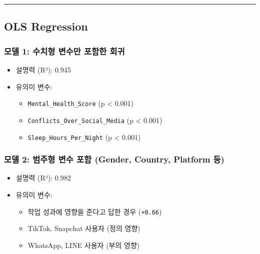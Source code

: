 \documentclass[11pt]{article}
\providecommand{\tightlist}{%
      \setlength{\itemsep}{0pt}\setlength{\parskip}{0pt}}
\begin{document}
    \begin{center}\rule{0.5\linewidth}{0.5pt}\end{center}

\subsection{OLS Regression}\label{ols-regression}

\subsubsection{모델 1: 수치형 변수만 포함한
회귀}\label{uxbaa8uxb378-1-uxc218uxce58uxd615-uxbcc0uxc218uxb9cc-uxd3ecuxd568uxd55c-uxd68cuxadc0}

\begin{itemize}
\tightlist
\item
  설명력 (R²): 0.945
\item
  유의미 변수:

  \begin{itemize}
  \tightlist
  \item
    \texttt{Mental\_Health\_Score} (p \textless{} 0.001)
  \item
    \texttt{Conflicts\_Over\_Social\_Media} (p \textless{} 0.001)
  \item
    \texttt{Sleep\_Hours\_Per\_Night} (p \textless{} 0.001)
  \end{itemize}
\end{itemize}

\subsubsection{모델 2: 범주형 변수 포함 (Gender, Country, Platform
등)}\label{uxbaa8uxb378-2-uxbc94uxc8fcuxd615-uxbcc0uxc218-uxd3ecuxd568-gender-country-platform-uxb4f1}

\begin{itemize}
\tightlist
\item
  설명력 (R²): 0.982
\item
  유의미 변수:

  \begin{itemize}
  \tightlist
  \item
    학업 성과에 영향을 준다고 답한 경우 (\texttt{+0.66})
  \item
    TikTok, Snapchat 사용자 (정의 영향)
  \item
    WhatsApp, LINE 사용자 (부의 영향)
  \end{itemize}
\end{itemize}
\end{document}
